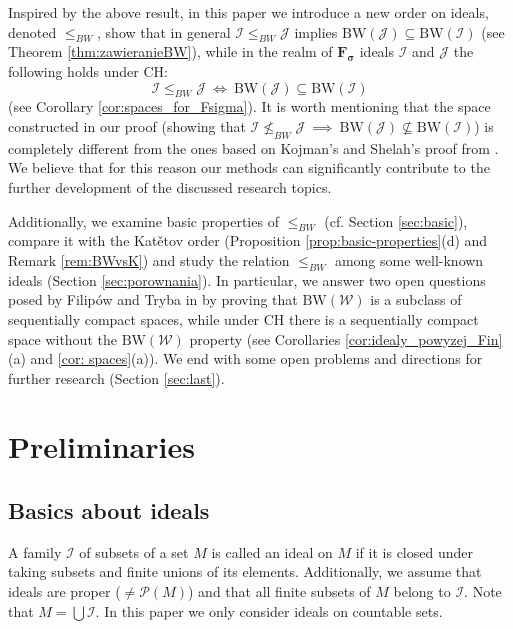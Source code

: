 \documentclass{amsart}
\theoremstyle{plain}
\theoremstyle{definition}
\theoremstyle{remark}
\newcommand{\cI}{\mathcal{I}}
\newcommand{\I}{\cI}
\newcommand{\cJ}{\mathcal{J}}
\newcommand{\J}{\cJ}
\newcommand{\cW}{\mathcal{W}}
\newcommand{\BW}{\mathrm{BW}}
\begin{document}
Inspired by the above result, in this paper we introduce a new order on ideals, denoted $\leq_{BW}$, show that in general $\mathcal{I}\leq_{BW}\mathcal{J}$ implies $\mathrm{BW}(\mathcal{J})\subseteq\mathrm{BW}(\mathcal{I})$ (see Theorem \ref{thm:zawieranieBW}), while in the realm of $\mathbf{F_\sigma}$ ideals $\I$ and $\J$ the following holds under CH:
$$\I\leq_{BW}\J\ \iff\ \BW(\J)\subseteq\BW(\I)$$
(see Corollary \ref{cor:spaces_for_Fsigma}). It is worth mentioning that the space constructed in our proof (showing that $\I\not\leq_{BW}\J\ \implies\ \BW(\J)\not\subseteq\BW(\I)$) is completely different from the ones based on Kojman's and Shelah's proof from \cite{KojmanShelah}. We believe that for this reason our methods can significantly contribute to the further development of the discussed research topics.

Additionally, we examine basic properties of $\leq_{BW}$ (cf. Section \ref{sec:basic}), compare it with the Kat\v{e}tov order (Proposition \ref{prop:basic-properties}(d) and Remark \ref{rem:BWvsK}) and study the relation $\leq_{BW}$ among some well-known ideals (Section \ref{sec:porownania}). In particular, we answer two open questions posed by Filip\'{o}w and Tryba in \cite[Questions 2 and 3]{FT} by proving that $\BW(\cW)$ is a subclass of sequentially compact spaces, while under CH there is a sequentially compact space without the $\BW(\cW)$ property (see  Corollaries \ref{cor:idealy_powyzej_Fin}(a) and \ref{cor: spaces}(a)). We end with some open problems and directions for further research (Section \ref{sec:last}).





\section{Preliminaries}
\label{sec:preliminaries}

\subsection{Basics about ideals}

A family $\I$ of subsets of a set $M$ is called an ideal on $M$ if it is closed under taking subsets and finite unions of its elements. Additionally, we assume that ideals are proper ($\neq \mathcal{P}(M)$) and that all finite subsets of $M$ belong to $\I$. Note that $M=\bigcup\I$. In this paper we only consider ideals on countable sets. 
\end{document}
